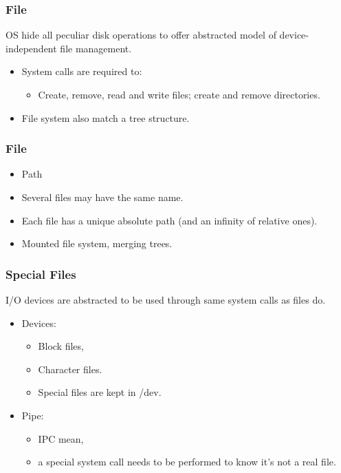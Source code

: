   \begin{frame}
    \frametitle{File}
    OS hide all peculiar disk operations to offer abstracted model of device-independent file management.
      \begin{itemize}
        \item System calls are required to:
        \begin{itemize}
          \item Create, remove, read and write files; create and remove directories.
        \end{itemize}
        \item File system also match a tree structure.
      \end{itemize}
  \end{frame}
  \begin{frame}
    \frametitle{File}
      \begin{itemize}
        \item Path
        \item Several files may have the same name.
        \item Each file has a unique absolute path (and an infinity of relative ones).
        \item Mounted file system, merging trees.
      \end{itemize}
  \end{frame}
  \begin{frame}
    \frametitle{Special Files}
      I/O devices are abstracted to be used through same system calls as files do.
      \begin{itemize}
        \item Devices:
          \begin{itemize}
            \item Block files,
            \item Character files.
            \item Special files are kept in /dev.
          \end{itemize}
        \item Pipe:
          \begin{itemize}
            \item IPC mean,
            \item a special system call needs to be performed to know it's not a real file.
          \end{itemize}
      \end{itemize}
  \end{frame}

